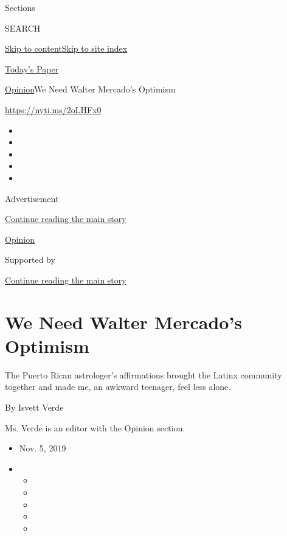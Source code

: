 Sections

SEARCH

\protect\hyperlink{site-content}{Skip to
content}\protect\hyperlink{site-index}{Skip to site index}

\href{https://myaccount.nytimes3xbfgragh.onion/auth/login?response_type=cookie\&client_id=vi}{}

\href{https://www.nytimes3xbfgragh.onion/section/todayspaper}{Today's
Paper}

\href{/section/opinion}{Opinion}\textbar{}We Need Walter Mercado's
Optimism

\url{https://nyti.ms/2oLHFx0}

\begin{itemize}
\item
\item
\item
\item
\item
\end{itemize}

Advertisement

\protect\hyperlink{after-top}{Continue reading the main story}

\href{/section/opinion}{Opinion}

Supported by

\protect\hyperlink{after-sponsor}{Continue reading the main story}

\hypertarget{we-need-walter-mercados-optimism}{%
\section{We Need Walter Mercado's
Optimism}\label{we-need-walter-mercados-optimism}}

The Puerto Rican astrologer's affirmations brought the Latinx community
together and made me, an awkward teenager, feel less alone.

By Isvett Verde

Ms. Verde is an editor with the Opinion section.

\begin{itemize}
\item
  Nov. 5, 2019
\item
  \begin{itemize}
  \item
  \item
  \item
  \item
  \item
  \end{itemize}
\end{itemize}

